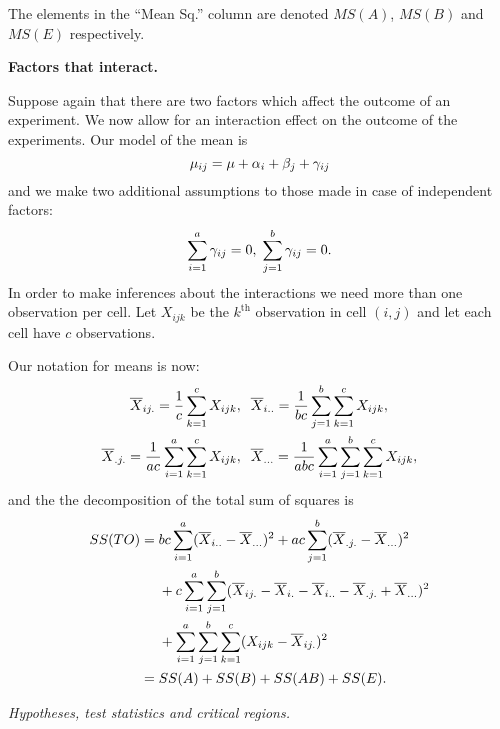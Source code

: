\documentclass[10pt, two column]{article}
\begin{document}
The elements in the ``Mean Sq.'' column are denoted $MS(A)$, $MS(B)$ and $MS(E)$ respectively. 

{\bf Factors that interact.}

Suppose again that there are two factors which affect the outcome of an experiment. We now allow for an interaction effect on the outcome of the experiments. Our model of the mean is \vspace{-5pt}
\[
\mu_{ij} = \mu + \alpha_{i} + \beta_{j} + \gamma_{ij} \vspace{-5pt}
\]
and we make two additional assumptions to those made in case of independent factors: \vspace{-5pt}
\[
\sum_{i=1}^{a} \gamma_{ij} = 0, \; \sum_{j=1}^{b} \gamma_{ij} = 0. \vspace{-5pt}
\]
In order to make inferences about the interactions we need more than one observation per cell. Let $X_{ijk}$ be the $k^{\text{th}}$ observation in cell $(i,j)$ and let each cell have $c$ observations.

Our notation for means is now: \vspace{-5pt}
\begin{align*}
\overline{X}_{ij.} = \frac{1}{c} \sum_{k=1}^{c} X_{ijk}&, \; \; \overline{X}_{i..} = \frac{1}{bc} \sum_{j=1}^{b} \sum_{k=1}^{c} X_{ijk}, \\
\overline{X}_{.j.} = \frac{1}{ac} \sum_{i=1}^{a} \sum_{k=1}^{c} X_{ijk}&, \;\; \overline{X}_{...} = \frac{1}{abc} \sum_{i=1}^{a} \sum_{j=1}^{b} \sum_{k=1}^{c} X_{ijk}, \vspace{-5pt}
\end{align*}   
and the the decomposition of the total sum of squares is \vspace{-5pt}
\begin{align*}
SS(TO) = \; &bc \sum_{i=1}^{a}(\overline{X}_{i..} - \overline{X}_{...})^{2} + ac \sum_{j=1}^{b}(\overline{X}_{.j.} - \overline{X}_{...})^{2}\\
&+ c \sum_{i=1}^{a} \sum_{j=1}^{b} (\overline{X}_{ij.} - \overline{X}_{i.} - \overline{X}_{i..} - \overline{X}_{.j.} + \overline{X}_{...})^{2} \\
&+ \sum_{i=1}^{a} \sum_{j=1}^{b} \sum_{k=1}^{c} (X_{ijk} - \overline{X}_{ij.})^{2} \\
= \; &SS(A) + SS(B) + SS(AB) + SS(E).  \vspace{-5pt}
\end{align*}

\emph{Hypotheses, test statistics and critical regions.}
\end{document}
